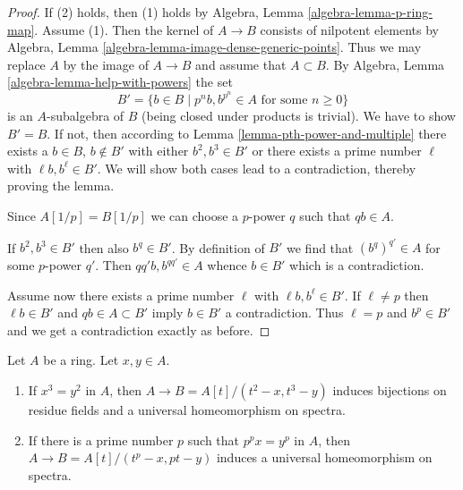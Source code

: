 \begin{proof}
If (2) holds, then (1) holds by Algebra, Lemma \ref{algebra-lemma-p-ring-map}.
Assume (1). Then the kernel of $A \to B$ consists of nilpotent
elements by Algebra, Lemma \ref{algebra-lemma-image-dense-generic-points}.
Thus we may replace $A$ by the image of $A \to B$ and assume that
$A \subset B$. By Algebra, Lemma \ref{algebra-lemma-help-with-powers}
the set
$$
B' = \{b \in B \mid p^nb, b^{p^n} \in A\text{ for some }n \geq 0\}
$$
is an $A$-subalgebra of $B$ (being closed under products is trivial).
We have to show $B' = B$. If not, then
according to Lemma \ref{lemma-pth-power-and-multiple}
there exists a $b \in B$, $b \not \in B'$ with either
$b^2, b^3 \in B'$ or there exists a prime number $\ell$
with $\ell b, b^\ell \in B'$.
We will show both cases lead to a contradiction, thereby proving the lemma.

\medskip\noindent
Since $A[1/p] = B[1/p]$ we can choose a $p$-power $q$ such that $qb \in A$.

\medskip\noindent
If $b^2, b^3 \in B'$ then also $b^q \in B'$. By definition of $B'$
we find that $(b^q)^{q'} \in A$ for some $p$-power $q'$.
Then $qq'b, b^{qq'} \in A$ whence $b \in B'$ which is a contradiction.

\medskip\noindent
Assume now there exists a prime number $\ell$ with $\ell b, b^\ell \in B'$.
If $\ell \not = p$ then $\ell b \in B'$ and $qb \in A \subset B'$ imply
$b \in B'$ a contradiction. Thus $\ell = p$ and $b^p \in B'$
and we get a contradiction exactly as before.
\end{proof}

\begin{lemma}
\label{lemma-make-universal-homeo}
Let $A$ be a ring. Let $x, y \in A$.
\begin{enumerate}
\item If $x^3 = y^2$ in $A$, then $A \to B = A[t]/(t^2 - x, t^3 - y)$
induces bijections on residue fields and a
universal homeomorphism on spectra.
\item If there is a prime number $p$ such that $p^px = y^p$ in $A$, then
$A \to B = A[t]/(t^p - x, pt - y)$ induces a universal
homeomorphism on spectra.
\end{enumerate}
\end{lemma}

